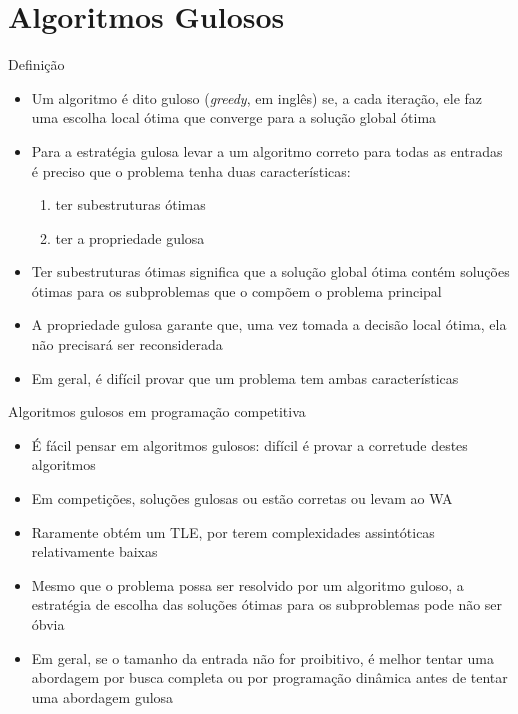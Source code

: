 \section{Algoritmos Gulosos}

\begin{frame}[fragile]{Definição}

    \begin{itemize}
        \item Um algoritmo é dito guloso (\textit{greedy}, em inglês) se, a cada iteração,
            ele faz uma escolha local ótima que converge para a solução global ótima

        \item Para a estratégia gulosa levar a um algoritmo correto para todas as entradas
            é preciso que o problema tenha duas características:

        \begin{enumerate}
            \item ter subestruturas ótimas
            \item ter a propriedade gulosa
        \end{enumerate}

        \item Ter  subestruturas ótimas significa que a solução global ótima contém soluções
            ótimas para os subproblemas que o compõem o problema principal

        \item A propriedade gulosa garante que, uma vez tomada a decisão local ótima, ela não
            precisará ser reconsiderada 

        \item Em geral, é difícil provar que um problema tem ambas características
    \end{itemize}

\end{frame}

\begin{frame}[fragile]{Algoritmos gulosos em programação competitiva}

    \begin{itemize}
        \item É fácil pensar em algoritmos gulosos: difícil é provar a corretude destes algoritmos

        \item Em competições, soluções gulosas ou estão corretas ou levam ao WA

        \item Raramente obtém um TLE, por terem complexidades assintóticas relativamente baixas

        \item Mesmo que o problema possa ser resolvido por um algoritmo guloso, a estratégia 
            de escolha das soluções ótimas para os subproblemas pode não ser óbvia

        \item Em geral, se o tamanho da entrada não for proibitivo, é melhor tentar uma abordagem
            por busca completa ou por programação dinâmica antes de tentar uma abordagem gulosa
    \end{itemize}

\end{frame}

